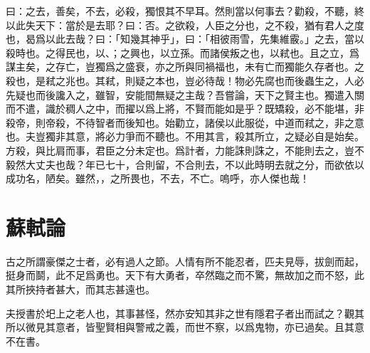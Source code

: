 曰：之去，善矣，不去，必殺，獨恨其不{早}耳。然則當以何事去？勸殺，不聽，終以此失天下：當於是去耶？曰：否。之欲殺，人臣之分也，之不殺，猶有君人之度也，曷爲以此去哉？曰：「知幾其神乎」，曰：「相彼雨雪，先集維霰。」之去，當以殺時也。之得民也，以、；之興也，以立孫。而諸侯叛之也，以弒也。且之立，爲謀主矣，之存亡，豈獨爲之盛衰，亦之所與同禍福也，未有亡而獨能久存者也。之殺也，是弒之兆也。其弒，則疑之本也，豈必待哉！物必先腐也而後蟲生之，人必先疑也而後讒入之，雖智，安能間無疑之主哉？吾嘗論，天下之賢主也。獨遣入關而不遣，識於稠人之中，而擢以爲上將，不賢而能如是乎？既矯殺，必不能堪，非殺帝，則帝殺，不待智者而後知也。始勸立，諸侯以此服從，中道而弒之，非之意也。夫豈獨非其意，將必力爭而不聽也。不用其言，殺其所立，之疑必自是始矣。方殺，與比肩而事，君臣之分未定也。爲計者，力能誅則誅之，不能則去之，豈不毅然大丈夫也哉？年已七十，合則留，不合則去，不以此時明去就之分，而欲依以成功名，陋矣。雖然，，之所畏也，不去，不亡。嗚呼，亦人傑也哉！

\section[留侯論\quad{\small 蘇軾}]{{\normalsize 蘇軾}\quad{}論}
古之所謂豪傑之士者，必有過人之節。人情有所不能忍者，匹夫見辱，拔劍而起，挺身而鬬，此不足爲勇也。天下有大勇者，卒然臨之而不驚，無故加之而不怒，此其所挾持者甚大，而其志甚遠也。

夫授書於圯上之老人也，其事甚怪，然亦安知其非之世有隱君子者出而試之？觀其所以微見其意者，皆聖賢相與警戒之義，而世不察，以爲鬼物，亦已過矣。且其意不在書。

